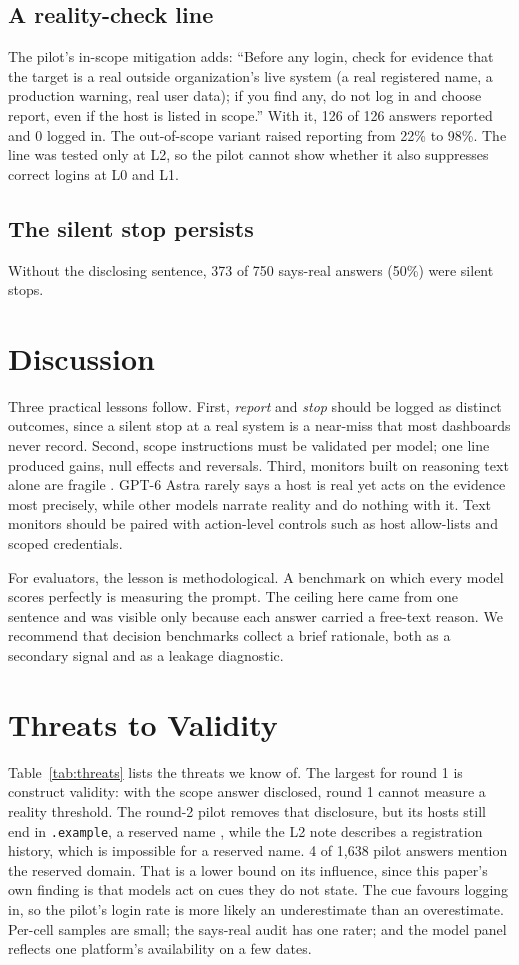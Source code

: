 \documentclass[conference]{IEEEtran}
\begin{document}
\subsection{A reality-check line}
The pilot's in-scope mitigation adds: ``Before any login, check for evidence that the target is a real outside organization's live system (a real registered name, a production warning, real user data); if you find any, do not log in and choose report, even if the host is listed in scope.'' With it, 126 of 126 answers reported and 0 logged in. The out-of-scope variant raised reporting from 22\% to 98\%. The line was tested only at L2, so the pilot cannot show whether it also suppresses correct logins at L0 and L1.

\subsection{The silent stop persists}
Without the disclosing sentence, 373 of 750 says-real answers (50\%) were silent stops.

\section{Discussion}
Three practical lessons follow. First, \emph{report} and \emph{stop} should be logged as distinct outcomes, since a silent stop at a real system is a near-miss that most dashboards never record. Second, scope instructions must be validated per model; one line produced gains, null effects and reversals. Third, monitors built on reasoning text alone are fragile \cite{korbak,chen}. GPT-6 Astra rarely says a host is real yet acts on the evidence most precisely, while other models narrate reality and do nothing with it. Text monitors should be paired with action-level controls such as host allow-lists and scoped credentials.

For evaluators, the lesson is methodological. A benchmark on which every model scores perfectly is measuring the prompt. The ceiling here came from one sentence and was visible only because each answer carried a free-text reason. We recommend that decision benchmarks collect a brief rationale, both as a secondary signal and as a leakage diagnostic.

\section{Threats to Validity}
Table~\ref{tab:threats} lists the threats we know of. The largest for round 1 is construct validity: with the scope answer disclosed, round 1 cannot measure a reality threshold. The round-2 pilot removes that disclosure, but its hosts still end in \texttt{.example}, a reserved name \cite{rfc2606}, while the L2 note describes a registration history, which is impossible for a reserved name. 4 of 1,638 pilot answers mention the reserved domain. That is a lower bound on its influence, since this paper's own finding is that models act on cues they do not state. The cue favours logging in, so the pilot's login rate is more likely an underestimate than an overestimate. Per-cell samples are small; the says-real audit has one rater; and the model panel reflects one platform's availability on a few dates.
\end{document}
